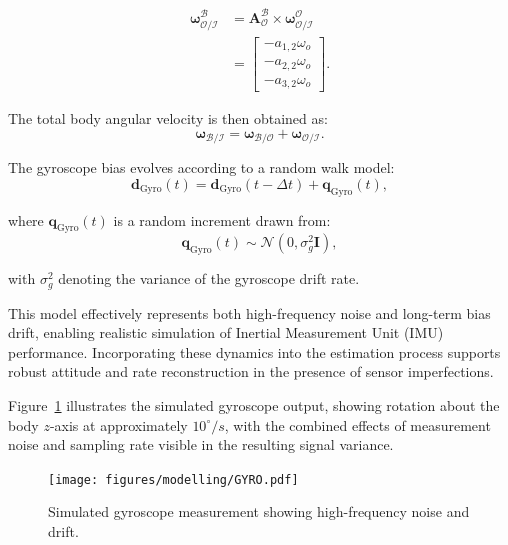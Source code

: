 \begin{equation}
    \begin{split}
    \boldsymbol{\omega}_\mathcal{O/I}^\mathcal{B} &= \mathbf{A}_\mathcal{O}^\mathcal{B} \times \boldsymbol{\omega}_\mathcal{O/I}^\mathcal{O} \\
    &= 
    \begin{bmatrix}
        -a_{1,2}\omega_o \\
        -a_{2,2}\omega_o \\
        -a_{3,2}\omega_o
    \end{bmatrix}.
    \end{split}
\end{equation}

\noindent The total body angular velocity is then obtained as:
\begin{equation}
    \boldsymbol{\omega}_\mathcal{B/I} = \boldsymbol{\omega}_\mathcal{B/O} + \boldsymbol{\omega}_\mathcal{O/I}.
\end{equation}

\noindent The gyroscope bias evolves according to a random walk model:
\begin{equation}
    \mathbf{d}_{\text{Gyro}}(t) = \mathbf{d}_{\text{Gyro}}(t - \Delta t) + \mathbf{q}_{\text{Gyro}}(t),
\end{equation}

\noindent where $\mathbf{q}_{\text{Gyro}}(t)$ is a random increment drawn from:
\begin{equation}
    \mathbf{q}_{\text{Gyro}}(t) \sim \mathcal{N}(0, \sigma_g^2 \mathbf{I}),
\end{equation}

\noindent with $\sigma_g^2$ denoting the variance of the gyroscope drift rate.
\vspace{0.5cm}

\noindent This model effectively represents both high-frequency noise and long-term bias drift, enabling realistic simulation of Inertial Measurement Unit (IMU) performance. Incorporating these dynamics into the estimation process supports robust attitude and rate reconstruction in the presence of sensor imperfections.

\vspace{0.5cm}
\noindent Figure~\ref{fig:GYRO} illustrates the simulated gyroscope output, showing rotation about the body $z$-axis at approximately $10^\circ/s$, with the combined effects of measurement noise and sampling rate visible in the resulting signal variance.

\begin{figure}[H]
    \centering
    \texttt{[image: figures/modelling/GYRO.pdf]}
    \caption{Simulated gyroscope measurement showing high-frequency noise and drift.}
    \label{fig:GYRO}
\end{figure}


